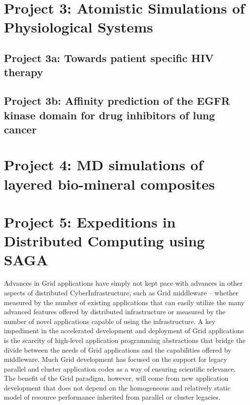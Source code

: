\documentclass[a4paper,10pt]{article}
\newcommand{\up}{\vspace*{-1em}}
\begin{document}
\section*{Project 3: Atomistic Simulations of Physiological Systems}

\subsection*{Project 3a: Towards patient specific HIV therapy}


\subsection*{Project 3b: Affinity prediction of the EGFR kinase domain for drug inhibitors of lung cancer}


\up\up
\section*{Project 4: MD simulations of layered bio-mineral composites}
 
\up

\up
\section*{Project 5: Expeditions in Distributed Computing using SAGA}
\up

Advances in Grid applications have simply not kept pace with advances in other aspects of 
distributed CyberInfrastructure, such as Grid middleware -- whether measured by the number of 
existing applications that can easily utilize the many advanced features offered by distributed 
infrastructure or measured by the number of novel applications capable of using the 
infrastructure. A key impediment in the accelerated development and deployment of Grid 
applications is the scarcity of high-level application programming abstractions that bridge the 
divide between the needs of Grid applications and the capabilities offered by middleware.  Much 
Grid development has focused on the support for legacy parallel and cluster application codes 
as a way of ensuring scientific relevance.  The benefit of the Grid paradigm, however, will 
come from new application development that does not depend on the homogeneous and relatively 
static model of resource performance inherited from parallel or cluster legacies.  %
\end{document}
